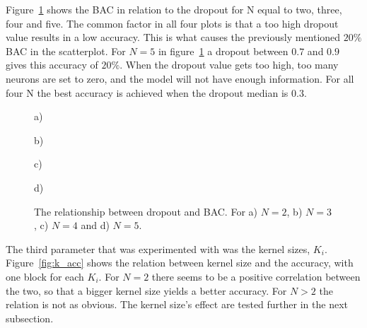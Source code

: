 Figure~\ref{fig:dropout_acc} shows the BAC in relation to the dropout for N equal to two, three, four and five. The common factor in all four plots is that a too high dropout value results in a low accuracy. This is what causes the previously mentioned $20\%$ BAC in the scatterplot. For $N=5$ in figure~\ref{fig:dropout_acc} a dropout between $0.7$ and $0.9$ gives this accuracy of $20\%$. When the dropout value gets too high, too many neurons are set to zero, and the model will not have enough information. For all four N the best accuracy is achieved when the dropout median is $0.3$. 

\begin{figure}[H]
    \centering
    \begin{minipage}[b]{0.42\textwidth}
        
        \vspace{-0.5cm}
        \caption*{a)}
    \end{minipage}
    \begin{minipage}[b]{0.42\textwidth}
        
        \vspace{-0.5cm}
        \caption*{b)}
    \end{minipage}
    \begin{minipage}[b]{0.42\textwidth}
        
        \vspace{-0.5cm}
        \caption*{c)}
    \end{minipage}
    \begin{minipage}[b]{0.42\textwidth}
        
        \vspace{-0.5cm}
        \caption*{d)}
    \end{minipage}
    \captionsetup{width=0.95\linewidth}
    \caption{The relationship between dropout and BAC. For a) $N=2$, b) $N=3$, c) $N=4$ and d) $N=5$.}
    \label{fig:dropout_acc}
\end{figure}


The third parameter that was experimented with was the kernel sizes, $K_i$. Figure~\ref{fig:k_acc} shows the relation between kernel size and the accuracy, with one block for each $K_i$. For $N=2$ there seems to be a positive correlation between the two, so that a bigger kernel size yields a better accuracy. For $N>2$ the relation is not as obvious. The kernel size's effect are tested further in the next subsection.


